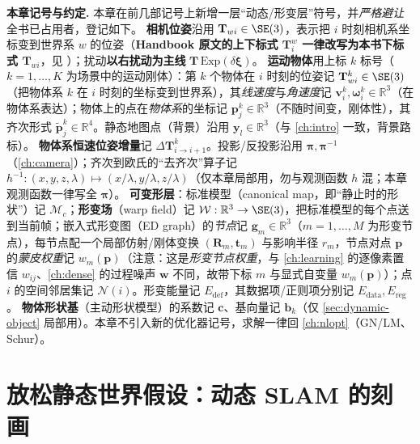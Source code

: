 \begin{note}
\textbf{本章记号与约定.}\;
本章在前几部记号上新增一层“动态/形变层”符号，并\emph{严格避让}全书已占用者，登记如下。
\textbf{相机位姿}沿用 $\mathbf{T}_{wi}\in\SE(3)$，表示把 $i$ 时刻相机系坐标变到世界系 $w$ 的位姿（\textbf{Handbook 原文的上下标式 $\mathbf{T}_i^w$ 一律改写为本书下标式 $\mathbf{T}_{wi}$}，见 ）；扰动\textbf{以右扰动为主线} $\mathbf{T}\,\mathrm{Exp}(\delta\boldsymbol\xi)$。
\textbf{运动物体}用上标 $k$ 标号（$k=1,\dots,K$ 为场景中的运动刚体）：第 $k$ 个物体在 $i$ 时刻的位姿记 $\mathbf{T}_{wi}^{k}\in\SE(3)$（把物体系 $k$ 在 $i$ 时刻的坐标变到世界系），其\emph{线速度}与\emph{角速度}记 $\mathbf{v}_i^{k},\boldsymbol\omega_i^{k}\in\mathbb{R}^3$（在物体系表达）；物体上的点在\emph{物体系}的坐标记 $\mathbf{p}_j^{k}\in\mathbb{R}^3$（不随时间变，刚体性），其齐次形式 $\tilde{\mathbf{p}}_j^{k}\in\mathbb{R}^4$。静态地图点（背景）沿用 $\mathbf{y}_l\in\mathbb{R}^3$（与 \cref{ch:intro} 一致，背景路标）。
\textbf{物体系恒速位姿增量}记 $\Delta\mathbf{T}^{k}_{i\to i+1}$。投影/反投影沿用 $\boldsymbol\pi,\boldsymbol\pi^{-1}$（\cref{ch:camera}）；齐次到欧氏的“去齐次”算子记 $h^{-1}:(x,y,z,\lambda)\mapsto(x/\lambda,y/\lambda,z/\lambda)$（仅本章局部用，勿与观测函数 $h$ 混；本章观测函数一律写全 $\boldsymbol\pi$）。
\textbf{可变形层}：标准模型（canonical map，即“静止时的形状”）记 $\mathcal{M}_c$；\textbf{形变场}（warp field）记 $\mathcal{W}:\mathbb{R}^3\to\SE(3)$，把标准模型的每个点送到当前帧；嵌入式形变图（ED graph）的\emph{节点}记 $\mathbf{g}_m\in\mathbb{R}^3$（$m=1,\dots,M$ 为形变节点），每节点配一个局部仿射/刚体变换 $(\mathbf{R}_m,\mathbf{t}_m)$ 与影响半径 $r_m$，节点对点 $\mathbf{p}$ 的\emph{蒙皮权重}记 $w_m(\mathbf{p})$（注意：这是\emph{形变节点权重}，与 \cref{ch:learning} 的逐像素置信 $w_{ij}$、\cref{ch:dense} 的过程噪声 $\mathbf{w}$ 不同，故带下标 $m$ 与显式自变量 $w_m(\mathbf{p})$）；点 $i$ 的空间邻居集记 $\mathcal{N}(i)$。形变能量记 $E_{\mathrm{def}}$，其数据项/正则项分别记 $E_{\mathrm{data}},E_{\mathrm{reg}}$。
\textbf{物体形状基}（主动形状模型）的系数记 $\mathbf{c}$、基向量记 $\mathbf{b}_k$（仅 \cref{sec:dynamic-object} 局部用）。本章不引入新的优化器记号，求解一律回 \cref{ch:nlopt}（GN/LM、Schur）。
\end{note}

\section{放松静态世界假设：动态 SLAM 的刻画}
\label{sec:dynamic-frame}

